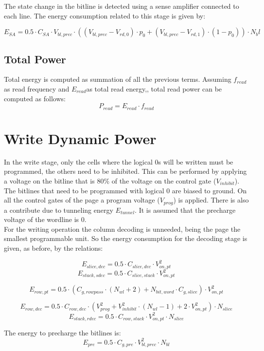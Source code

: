 The state change in the bitline is detected using a sense amplifier connected to each line.
The energy consumption related to this stage is given by:

\[
E_{SA}= 0.5 \cdot C_{SA} \cdot V_{bl,prec} \cdot ((V_{bl,prec}-V_{rd,0}) \cdot p_0 + (V_{bl,prec}-V_{rd,1}) \cdot (1-p_0)) \cdot N_bl
\]


\subsection{Total Power}
\label{sec:total_power}

Total energy is computed as summation of all the previous terms.
Assuming $f_{read}$ as read frequency and $E_{read}$as total read energy,, total read power can be computed as follows:
\[
P_{read}=E_{read}\cdot f_{read}
\]

\section{Write Dynamic Power}
\label{sec:write_power}
In the write stage, only the cells where the logical 0s will be written must be programmed, the others need to be inhibited. This can be performed by applying a voltage on the bitline that is 80\% of the voltage on the control gate ($V_{inhibit}$). The bitlines that need to be programmed with logical 0 are biased to ground. On all the control gates of the page a program voltage ($V_{prog}$) is applied. There is also a contribute due to tunneling energy $E_{tunnel}$.  It is assumed that the precharge voltage of the wordline is 0.\\

For the writing operation the column decoding is unneeded, being the page the smallest programmable unit. 
So the energy consumption for the decoding stage is given, as before, by the relations: 

\[
E_{slice,dec}= 0.5 \cdot C_{slice,dec} \cdot V_{on,pt}^2
\]
\[
E_{stack,sdec}=0.5 \cdot C_{slice,stack} \cdot V_{on,pt}^2
\]

\[
E_{row,pt}= 0.5 \cdot(C_{g,rowpass} \cdot (N_{wl}+2) + N_{bit,word} \cdot C_{g,slice} ) \cdot V_{on,pt}^2
\]

\[
E_{row,dec}= 0.5 \cdot C_{row,dec} \cdot (V_{prog}^2 + V_{inhibit}^2 \cdot (N_{wl}-1) + 2 \cdot V_{on,pt}^2) \cdot N_{slice}
\]
\[
E_{stack,rdec}=0.5 \cdot C_{row,stack} \cdot V_{on,pt}^2 \cdot N_{slice}
\]

The energy to precharge the bitlines is:
\[
E_{pre}= 0.5 \cdot C_{g,pre} \cdot V_{bl,prec}^2 \cdot N_{bl}
\]

